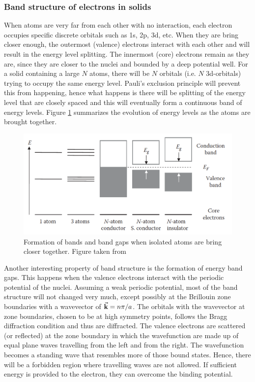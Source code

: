 \subsubsection{Band structure of electrons in solids}
When atoms are very far from each other with no interaction, each electron occupies specific discrete orbitals such as 1s, 2p, 3d, etc. When they are bring  closer enough, the outermost (valence) electrons interact with each other and will result in the  energy level splitting. The innermost (core) electrons remain as they are, since they are closer to the nuclei and bounded by a deep potential well. For a solid containing a large $N$ atoms, there will be $N$ orbitals (i.e. $N$ 3d-orbitals) trying to occupy the same energy level. Pauli's exclusion principle will prevent this from happening, hence what happens is there will be splitting of the energy level that are closely spaced and this will eventually form a continuous band of energy levels. Figure \ref{fig:band_model} summarizes the evolution of energy levels as the atoms are brought together.

\begin{figure}[tbh!]
	\centering
	\includegraphics[width=0.7\linewidth]{"images/band model"}
	\caption[Band structure in solids]{Formation of bands and band gaps when isolated atoms are bring closer together. Figure taken from \citep{Lee2016}}
	\label{fig:band_model}
\end{figure}

Another interesting property of band structure is the formation of energy band gaps. This happens when the valence electrons interact with the periodic potential of the nuclei. Assuming a weak periodic potential, most of the band structure will not changed very much, except possibly at the Brillouin zone boundaries with a wavevector of $\va{k} = n \pi/ a$. The orbitals with the wavevector at zone boundaries, chosen to be at high symmetry points, follows the Bragg diffraction condition and thus are diffracted. The valence electrons are scattered (or reflected) at the zone boundary in which the wavefunction are made up of equal plane waves travelling from the left and from the right. The wavefunction becomes a standing wave that resembles more of those bound states. Hence, there will be a forbidden region where travelling waves are not allowed. If sufficient energy is provided to the electron, they can overcome the  binding potential.

